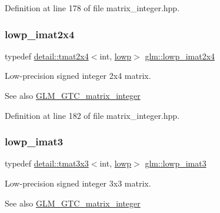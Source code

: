 Definition at line 178 of file matrix\+\_\+integer.\+hpp.

\mbox{\label{group__gtc__matrix__integer_ga4d859ef48cdfb15b2c9acc98064dd272}} 
\subsubsection{\texorpdfstring{lowp\+\_\+imat2x4}{lowp\_imat2x4}}
{\footnotesize\ttfamily typedef \hyperlink{structglm_1_1detail_1_1tmat2x4}{detail\+::tmat2x4}$<$int, \hyperlink{namespaceglm_a0f04f086094c747d227af4425893f545ae161af3fc695e696ce3bf69f7332bc2d}{lowp}$>$ \hyperlink{group__gtc__matrix__integer_ga4d859ef48cdfb15b2c9acc98064dd272}{glm\+::lowp\+\_\+imat2x4}}

Low-\/precision signed integer 2x4 matrix. \begin{DoxySeeAlso}{See also}
\hyperlink{group__gtc__matrix__integer}{G\+L\+M\+\_\+\+G\+T\+C\+\_\+matrix\+\_\+integer} 
\end{DoxySeeAlso}


Definition at line 182 of file matrix\+\_\+integer.\+hpp.

\mbox{\label{group__gtc__matrix__integer_ga149b90591e7275193c85cc08acbf0024}} 
\subsubsection{\texorpdfstring{lowp\+\_\+imat3}{lowp\_imat3}}
{\footnotesize\ttfamily typedef \hyperlink{structglm_1_1detail_1_1tmat3x3}{detail\+::tmat3x3}$<$int, \hyperlink{namespaceglm_a0f04f086094c747d227af4425893f545ae161af3fc695e696ce3bf69f7332bc2d}{lowp}$>$ \hyperlink{group__gtc__matrix__integer_ga149b90591e7275193c85cc08acbf0024}{glm\+::lowp\+\_\+imat3}}

Low-\/precision signed integer 3x3 matrix. \begin{DoxySeeAlso}{See also}
\hyperlink{group__gtc__matrix__integer}{G\+L\+M\+\_\+\+G\+T\+C\+\_\+matrix\+\_\+integer} 
\end{DoxySeeAlso}


